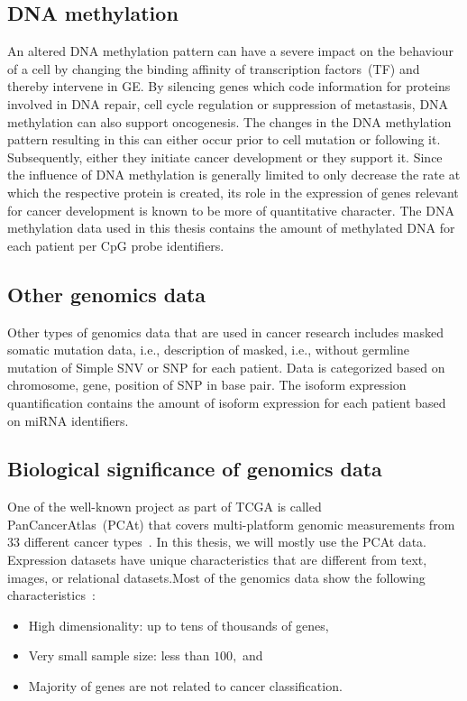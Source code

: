 \subsection{DNA methylation}
An altered DNA methylation pattern can have a severe impact on the behaviour of a cell by changing the binding affinity of transcription factors~(TF) and thereby intervene in GE. By silencing genes which code information for proteins involved in DNA repair, cell cycle regulation or suppression of metastasis, DNA methylation can also support oncogenesis. The changes in the DNA methylation pattern resulting in this can either occur prior to cell mutation or following it. Subsequently, either they initiate cancer development or they support it. Since the influence of DNA methylation is generally limited to only decrease the rate at which the respective protein is created, its role in the expression of genes relevant for cancer development is known to be more of quantitative character. The DNA methylation data used in this thesis contains the amount of methylated DNA for each patient per CpG probe identifiers. 

\subsection{Other genomics data}
Other types of genomics data that are used in cancer research includes masked somatic mutation data, i.e., description of masked, i.e., without germline mutation of Simple SNV or SNP for each patient. Data is categorized based on chromosome, gene, position of SNP in base pair. The isoform expression quantification contains the amount of isoform expression for each patient based on miRNA identifiers. 

\subsection{Biological significance of genomics data}
One of the well-known project as part of TCGA is called PanCancerAtlas~(PCAt) that covers multi-platform genomic measurements from 33 different cancer types~\cite{pancan}. In this thesis, we will mostly use the PCAt data. Expression datasets have unique characteristics that are different from text, images, or relational datasets.Most of the genomics data show the following characteristics~\cite{lu2003cancer}:

\begin{itemize}[noitemsep]
    \item High dimensionality: up to tens of thousands of genes,
    \item Very small sample size: less than $100,$ and
    \item Majority of genes are not related to cancer classification.
\end{itemize}

